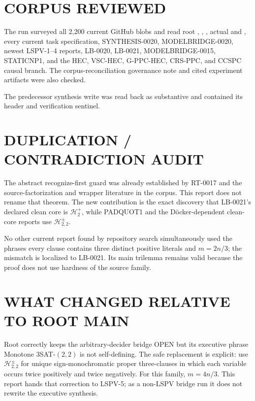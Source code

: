 \documentclass[11pt]{article}
\newcommand{\Hplus}{\mathcal H^{+}_{2}}
\newcommand{\Hsigned}{\mathcal H^{\pm}_{2,2}}
\begin{document}
\section{CORPUS REVIEWED}

The run surveyed all 2,200 current GitHub blobs and read root
, , , actual
 and , every current task specification,
SYNTHESIS-0020, MODELBRIDGE-0020, newest LSPV-1--4 reports, LB-0020,
LB-0021, MODELBRIDGE-0015, STATICNP1, and the HEC, VSC-HEC, G-PPC-HEC,
CRS-PPC, and CCSPC causal branch.  The corpus-reconciliation governance
note and cited experiment artifacts were also checked.

The predecessor synthesis write
was read back as substantive and contained its header and verification
sentinel.

\section{DUPLICATION / CONTRADICTION AUDIT}

The abstract recognize-first guard was already established by RT-0017 and
the source-factorization and wrapper literature in the corpus.  This report
does not rename that theorem.  The new contribution is the exact discovery
that LB-0021's declared clean core is $\Hplus$, while PADQUOT1 and the
D\"ocker-dependent clean-core reports use $\Hsigned$.

No other current report found by repository search simultaneously used the
phrases every clause contains three distinct positive literals and
$m=2n/3$; the mismatch is localized to LB-0021.  Its main trilemma remains
valid because the proof does not use hardness of the source family.

\section{WHAT CHANGED RELATIVE TO ROOT MAIN}

Root  correctly keeps the arbitrary-decider bridge OPEN but
its executive phrase Monotone $3$SAT-$(2,2)$ is not self-defining.
The safe replacement is explicit: use $\mathcal H^{\pm}_{2,2}$ for unique
sign-monochromatic proper three-clauses in which each variable occurs
twice positively and twice negatively.  For this family, $m=4n/3$.
This report hands that correction to LSPV-5; as a non-LSPV bridge run it
does not rewrite the executive synthesis.
\end{document}

